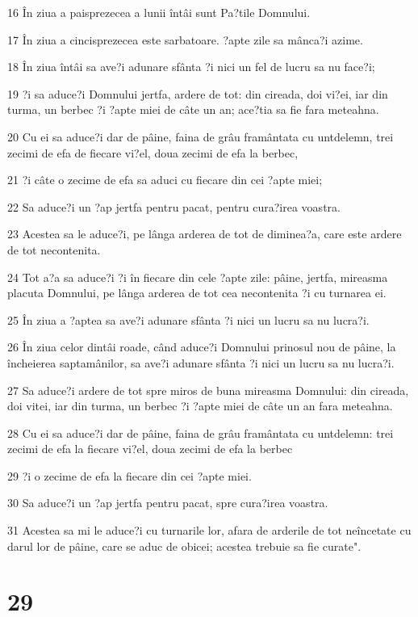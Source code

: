 \par 16 În ziua a paisprezecea a lunii întâi sunt Pa?tile Domnului.
\par 17 În ziua a cincisprezecea este sarbatoare. ?apte zile sa mânca?i azime.
\par 18 În ziua întâi sa ave?i adunare sfânta ?i nici un fel de lucru sa nu face?i;
\par 19 ?i sa aduce?i Domnului jertfa, ardere de tot: din cireada, doi vi?ei, iar din turma, un berbec ?i ?apte miei de câte un an; ace?tia sa fie fara meteahna.
\par 20 Cu ei sa aduce?i dar de pâine, faina de grâu framântata cu untdelemn, trei zecimi de efa de fiecare vi?el, doua zecimi de efa la berbec,
\par 21 ?i câte o zecime de efa sa aduci cu fiecare din cei ?apte miei;
\par 22 Sa aduce?i un ?ap jertfa pentru pacat, pentru cura?irea voastra.
\par 23 Acestea sa le aduce?i, pe lânga arderea de tot de diminea?a, care este ardere de tot necontenita.
\par 24 Tot a?a sa aduce?i ?i în fiecare din cele ?apte zile: pâine, jertfa, mireasma placuta Domnului, pe lânga arderea de tot cea necontenita ?i cu turnarea ei.
\par 25 În ziua a ?aptea sa ave?i adunare sfânta ?i nici un lucru sa nu lucra?i.
\par 26 În ziua celor dintâi roade, când aduce?i Domnului prinosul nou de pâine, la încheierea saptamânilor, sa ave?i adunare sfânta ?i nici un lucru sa nu lucra?i.
\par 27 Sa aduce?i ardere de tot spre miros de buna mireasma Domnului: din cireada, doi vitei, iar din turma, un berbec ?i ?apte miei de câte un an fara meteahna.
\par 28 Cu ei sa aduce?i dar de pâine, faina de grâu framântata cu untdelemn: trei zecimi de efa la fiecare vi?el, doua zecimi de efa la berbec
\par 29 ?i o zecime de efa la fiecare din cei ?apte miei.
\par 30 Sa aduce?i un ?ap jertfa pentru pacat, spre cura?irea voastra.
\par 31 Acestea sa mi le aduce?i cu turnarile lor, afara de arderile de tot neîncetate cu darul lor de pâine, care se aduc de obicei; acestea trebuie sa fie curate".

\chapter{29}

